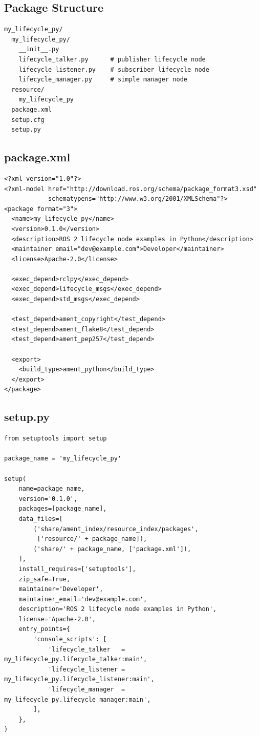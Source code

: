 \documentclass[12pt,a4paper]{article}
\begin{document}
\subsection{Package Structure}

\begin{lstlisting}[style=bash,caption={Python package layout}]
my_lifecycle_py/
  my_lifecycle_py/
    __init__.py
    lifecycle_talker.py      # publisher lifecycle node
    lifecycle_listener.py    # subscriber lifecycle node
    lifecycle_manager.py     # simple manager node
  resource/
    my_lifecycle_py
  package.xml
  setup.cfg
  setup.py
\end{lstlisting}

\subsection{package.xml}

\begin{lstlisting}[style=xml,caption={package.xml for the Python package}]
<?xml version="1.0"?>
<?xml-model href="http://download.ros.org/schema/package_format3.xsd"
            schematypens="http://www.w3.org/2001/XMLSchema"?>
<package format="3">
  <name>my_lifecycle_py</name>
  <version>0.1.0</version>
  <description>ROS 2 lifecycle node examples in Python</description>
  <maintainer email="dev@example.com">Developer</maintainer>
  <license>Apache-2.0</license>

  <exec_depend>rclpy</exec_depend>
  <exec_depend>lifecycle_msgs</exec_depend>
  <exec_depend>std_msgs</exec_depend>

  <test_depend>ament_copyright</test_depend>
  <test_depend>ament_flake8</test_depend>
  <test_depend>ament_pep257</test_depend>

  <export>
    <build_type>ament_python</build_type>
  </export>
</package>
\end{lstlisting}

\subsection{setup.py}

\begin{lstlisting}[style=python,caption={setup.py}]
from setuptools import setup

package_name = 'my_lifecycle_py'

setup(
    name=package_name,
    version='0.1.0',
    packages=[package_name],
    data_files=[
        ('share/ament_index/resource_index/packages',
         ['resource/' + package_name]),
        ('share/' + package_name, ['package.xml']),
    ],
    install_requires=['setuptools'],
    zip_safe=True,
    maintainer='Developer',
    maintainer_email='dev@example.com',
    description='ROS 2 lifecycle node examples in Python',
    license='Apache-2.0',
    entry_points={
        'console_scripts': [
            'lifecycle_talker   = my_lifecycle_py.lifecycle_talker:main',
            'lifecycle_listener = my_lifecycle_py.lifecycle_listener:main',
            'lifecycle_manager  = my_lifecycle_py.lifecycle_manager:main',
        ],
    },
)
\end{lstlisting}
\end{document}

